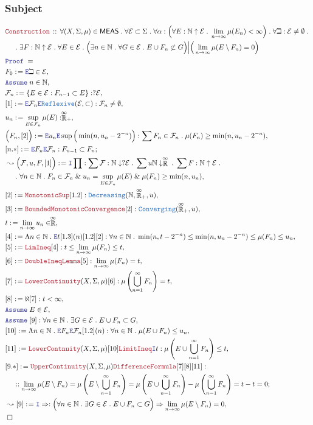 \documentclass[12pt]{scrartcl}
\newcommand{\TYPE}[1]{\textcolor{NavyBlue}{\mathtt{#1}}}
\newcommand{\LOGIC}[1]{\textcolor{Blue}{\mathtt{#1}}}
\newcommand{\THM}[1]{\textcolor{Maroon}{\mathtt{#1}}}
\renewcommand{\.}{\; . \;}
\newcommand{\de}{: \kern 0.1pc =}
\newcommand{\Theorem}[2]{& \THM{#1} \, :: \, #2 \\ & \Proof = \\ }
\newcommand{\NewLine}{\\ & \kern 1pc}
\newcommand{\Page}[1]{ \begin{align*} #1 \end{align*}   }
\renewcommand{\And}{\; \& \;}
\newcommand{\Imply}{\Rightarrow}
\newcommand{\Intro}{\LOGIC{I}}
\newcommand{\Elim}{\LOGIC{E}}
\newcommand{\Nat}{\mathbb{N} }
\newcommand{\EReals}{\stackrel{\mathclap{\infty}}{\mathbb{R}}}
\newcommand{\Say}[3]{& #1 \de #2 : #3, \\}
\newcommand{\SayIn}[3]{& #1 \de #2 \in #3, \\}
\newcommand{\Conclude}[3]{& #1 \de #2 : #3; \\}
\newcommand{\Derive}[3]{& \leadsto #1 \de #2 : #3, \\}
\newcommand{\Assume}[2]{& \LOGIC{Assume} \; #1 : #2, \\}
\newcommand{\AssumeIn}[2]{& \LOGIC{Assume} \; #1 \in #2, \\}
\newcommand{\QED}{\; \square}
\newcommand{\EndProof}{& \QED \\}
\newcommand{\Proof}{\LOGIC{Proof} \; }
\newcommand{\F}{\mathcal{F}}
\newcommand{\E}{\mathcal{E}}
\newcommand{\MEAS}{\mathsf{MEAS}}
\begin{document}
\subsubsection{Subject}
\Page{
	\Theorem{Construction}
	{
		\forall (X,\Sigma,\mu) \in \MEAS \.
		\forall \E \subset \Sigma \.
		\forall \alpha : \Big(\forall E : \Nat \uparrow \E \.
		\lim_{n \to \infty} \mu(E_n) < \infty \Big) \.
		\forall \beth : \E \neq \emptyset \.
		 \NewLine \.
		\exists F : \Nat \uparrow \E \.
		\forall E \in \E \.
		\Big( 
			\exists n \in \Nat \. \forall G \in \E \. E \cup F_n \not \subset G \Big)
		\Big|
		\Big(
			\lim_{n \to \infty} \mu(E \setminus F_n) =  0
		\Big)  
	}
	\SayIn{F_0}{\Elim \beth}{\E}
	\AssumeIn{n}{\Nat}
	\Say{\F_n}{\{ E \in \E : F_{n-1} \subset E \}}{?\E}
	\Say{[1]}{\Elim \F_n \Elim \TYPE{Reflexive}(\E,\subset)}{\F_n \neq \emptyset}
	\Say{u_n}{\sup_{E \in \F_n} \mu(E) }{\EReals_{+}}
	\Say{\Big(F_n,[2]\Big)}{\Elim u_n \Elim \sup\Big( \min(n,u_n-2^{-n})\Big)}
	{
		\sum F_n \in \F_n \. \mu(F_n) \ge \min(n,u_n-2^{-n})
	}
	\Conclude{[n.*]}{\Elim F_n \Elim \F_n}{F_{n-1} \subset F_n}
	\Derive{\Big(\F,u,F,[1]\Big)}{\Intro \prod}
	{
		\sum \F : \Nat \downarrow ?\E \.
		\sum u \Nat \downarrow \EReals \.
		\sum F : \Nat \uparrow \E \. \NewLine \.
		\forall n \in \Nat \.
		F_n \in \F_n  \And 
		u_n = 	\sup_{E \in \F_n} \mu(E) \And
		\mu(F_n) \ge \min(n,u_n)		
	}
	\Say{[2]}{\THM{MonotonicSup}[1.2]}
	{
		\TYPE{Decreasing}(\Nat,\EReals_+,u)
	}
	\Say{[3]}{\THM{BoundedMonotonicConvergence}[2]}
	{
		\TYPE{Converging}(\EReals_+,u)
	}
	\SayIn{t}{\lim_{n\to\infty} u_n}{\EReals}
	\Say{[4]}{\Lambda n \in \Nat \. \Elim t [1.3](n) [1.2][2]}
	{
		\forall n \in \Nat \. 
		\min(n,t - 2^{-n}) \le \min(n,u_n -2^{-n}) \le \mu(F_n) \le u_n
	}
	\Say{[5]}{\THM{LimIneq}[4]}{t \le \lim_{n \to \infty} \mu(F_n) \le t}
	\Say{[6]}{\THM{DoubleIneqLemma}[5]}{\lim_{n \to \infty} \mu(F_n) = t}
	\Say{[7]}{\THM{LowerContinuity}(X,\Sigma,\mu)[6]}{\mu\left( \bigcup^\infty_{n=1} F_n \right) = t}
	\Say{[8]}{\aleph [7]}{t < \infty}	
	\AssumeIn{E}{\E}
	\Assume{[9]}{\forall n \in \Nat \. \exists G \in \E \. E \cup F_n \subset G}
	\Say{[10]}{ \Lambda n \in \Nat \. \Elim F_n \Elim \F_n [1.2](n)  }
	{\forall n \in \Nat \. \mu(E \cup F_n) \le u_n }
	\Say{[11]}{\THM{LowerContnuity}(X,\Sigma,\mu)[10]\THM{LimitIneq}\Intro t}
	{
		\mu\left(E \cup \bigcup^\infty_{n=1} F_n\right) \le t
	}
	\Conclude{[9.*]}{\THM{UpperContinuity}(X,\Sigma,\mu)\THM{DifferenceFormula}[7][8][11]}
	{
		\NewLine ::		
		\lim_{n\to \infty} \mu(E \setminus F_n) =		
		\mu\left( E \setminus \bigcup^\infty_{n=1} F_n \right) =
		\mu\left(E \cup \bigcup^\infty_{n=1} F_n  \right) - \mu\left(\bigcup^\infty_{n=1} F_n \right) =
		t - t = 0
	}
	\Derive{[9]}{\Intro \Imply}
	{
		\Big(\forall n \in \Nat \. \exists G \in \E \. E \cup F_n \subset G\Big)
		\Imply
		\lim_{n\to \infty} \mu(E \setminus F_n) =	 0
	}
	\EndProof
}
\end{document}
